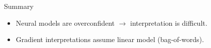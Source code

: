 
\begin{frame}{Summary}
\begin{itemize}
\item Neural models are overconfident $\to$ interpretation is difficult.
\pause
\item Gradient interpretations assume linear model (bag-of-words).
\end{itemize}      
\end{frame}

